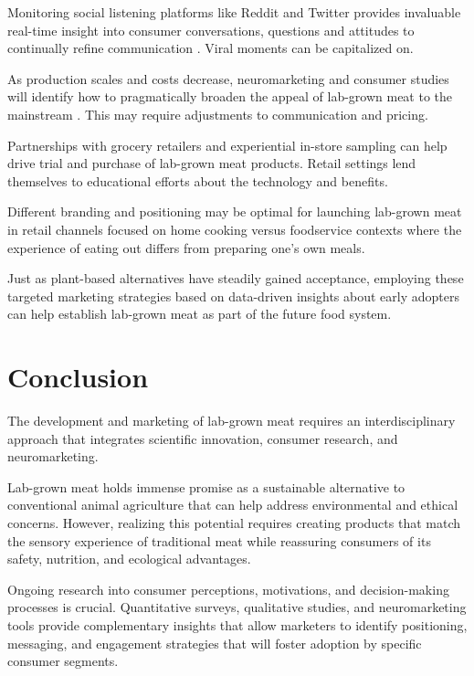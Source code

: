 \documentclass[10pt]{article}
\begin{document}
\begin{sloppypar}
  Monitoring social listening platforms like Reddit and Twitter provides invaluable real-time insight into consumer conversations, questions and attitudes to continually refine communication \citep{verbeke_would_2015}. Viral moments can be capitalized on.

  As production scales and costs decrease, neuromarketing and consumer studies will identify how to pragmatically broaden the appeal of lab-grown meat to the mainstream \citep{verbeke_would_2015}. This may require adjustments to communication and pricing.

  Partnerships with grocery retailers and experiential in-store sampling can help drive trial and purchase of lab-grown meat products. Retail settings lend themselves to educational efforts about the technology and benefits.

  Different branding and positioning may be optimal for launching lab-grown meat in retail channels focused on home cooking versus foodservice contexts where the experience of eating out differs from preparing one's own meals.

  Just as plant-based alternatives have steadily gained acceptance, employing these targeted marketing strategies based on data-driven insights about early adopters can help establish lab-grown meat as part of the future food system.

  \section{Conclusion}
  \label{sec:conclusion}

  The development and marketing of lab-grown meat requires an interdisciplinary approach that integrates scientific innovation, consumer research, and neuromarketing.

  Lab-grown meat holds immense promise as a sustainable alternative to conventional animal agriculture that can help address environmental and ethical concerns. However, realizing this potential requires creating products that match the sensory experience of traditional meat while reassuring consumers of its safety, nutrition, and ecological advantages.

  Ongoing research into consumer perceptions, motivations, and decision-making processes is crucial. Quantitative surveys, qualitative studies, and neuromarketing tools provide complementary insights that allow marketers to identify positioning, messaging, and engagement strategies that will foster adoption by specific consumer segments.


\end{sloppypar}
\end{document}
